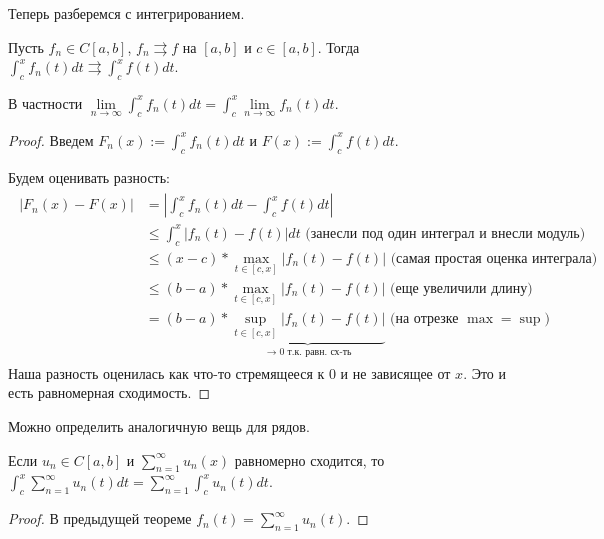 \vspace*{10mm}

Теперь разберемся с интегрированием.

\begin{theorem}
    Пусть $f_n \in C[a, b]$, $f_n \rightrightarrows f$ на $[a, b]$ и $c \in [a, b]$. 
    Тогда $\int_c^x f_n(t)dt \rightrightarrows \int_c^x f(t)dt$.

    В частности $\lim\limits_{n \to \infty} \int_c^x f_n(t)dt = \int_c^x \lim\limits_{n \to \infty} f_n(t)dt$.
\end{theorem}

\begin{proof}
    Введем $F_n(x) := \int_c^x f_n(t)dt$ и $F(x) := \int_c^x f(t)dt $. 
    
    \quad Будем оценивать разность:
    \begin{gather*}
        \begin{split}
            |F_n(x) - F(x)| &= \left|\int_c^x f_n(t)dt - \int_c^x f(t)dt \right| \\
            &\leqslant \int_c^x |f_n(t) - f(t)|dt \text{ (занесли под один интеграл и внесли модуль) } \\
            &\leqslant (x - c) * \max_{t \in [c, x]} |f_n(t) - f(t)| \text{ (самая простая оценка интеграла) } \\
            &\leqslant (b - a) * \max_{t \in [c, x]} |f_n(t) - f(t)| \text{ (еще увеличили длину) }\\
            &= (b - a) * \underbrace{\sup_{t \in [c, x]} |f_n(t) - f(t)|}_{\to 0 \text{ т.к. равн. сх-ть}} \text{ (на отрезке $\max = \sup$) }
        \end{split}
    \end{gather*}
    Наша разность оценилась как что-то стремящееся к 0 и не зависящее от $x$. Это и есть равномерная сходимость.
\end{proof}

\vspace*{7mm}

Можно определить аналогичную вещь для рядов.

\begin{follow}
    Если $u_n \in C[a, b]$ и $\sum\limits_{n=1}^\infty u_n(x)$ равномерно сходится, то $\int_c^x \sum\limits_{n=1}^\infty u_n(t) dt = \sum\limits_{n=1}^\infty \int_c^x u_n(t) dt$.
\end{follow}
\begin{proof}
    В предыдущей теореме $f_n(t) = \sum\limits_{n=1}^\infty u_n(t)$.
\end{proof}

